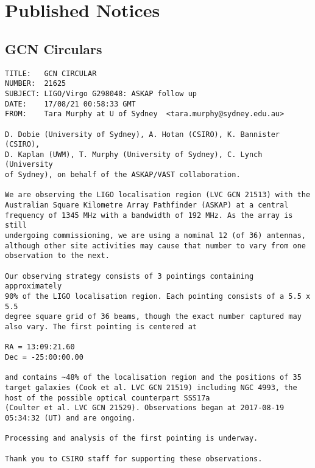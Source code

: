 \chapter{Published Notices}
\label{appendix:notices}
\section{GCN Circulars}
\begingroup
\footnotesize
{}
\begin{verbatim}
TITLE:   GCN CIRCULAR
NUMBER:  21625
SUBJECT: LIGO/Virgo G298048: ASKAP follow up
DATE:    17/08/21 00:58:33 GMT
FROM:    Tara Murphy at U of Sydney  <tara.murphy@sydney.edu.au>

D. Dobie (University of Sydney), A. Hotan (CSIRO), K. Bannister (CSIRO),
D. Kaplan (UWM), T. Murphy (University of Sydney), C. Lynch (University
of Sydney), on behalf of the ASKAP/VAST collaboration.

We are observing the LIGO localisation region (LVC GCN 21513) with the
Australian Square Kilometre Array Pathfinder (ASKAP) at a central
frequency of 1345 MHz with a bandwidth of 192 MHz. As the array is still
undergoing commissioning, we are using a nominal 12 (of 36) antennas,
although other site activities may cause that number to vary from one
observation to the next.

Our observing strategy consists of 3 pointings containing approximately
90% of the LIGO localisation region. Each pointing consists of a 5.5 x 5.5
degree square grid of 36 beams, though the exact number captured may
also vary. The first pointing is centered at

RA = 13:09:21.60
Dec = -25:00:00.00

and contains ~48% of the localisation region and the positions of 35
target galaxies (Cook et al. LVC GCN 21519) including NGC 4993, the
host of the possible optical counterpart SSS17a
(Coulter et al. LVC GCN 21529). Observations began at 2017-08-19
05:34:32 (UT) and are ongoing.

Processing and analysis of the first pointing is underway.

Thank you to CSIRO staff for supporting these observations.
\end{verbatim}
\pagebreak
{}
